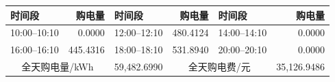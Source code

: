 \small\begin{tabular}{lrlrlr}\toprule 时间段 & 购电量 & 时间段 & 购电量 & 时间段 & 购电量\\\midrule
10:00--10:10 & 0.0000 & 12:00--12:10 & 480.4124 & 14:00--14:10 & 0.0000\\
16:00--16:10 & 445.4316 & 18:00--18:10 & 531.8940 & 20:00--20:10 & 0.0000\\
\midrule\multicolumn{2}{c}{全天购电量/kWh} & 59,482.6990 & \multicolumn{2}{c}{全天购电费/元} & 35,126.9486\\
\bottomrule\end{tabular}

